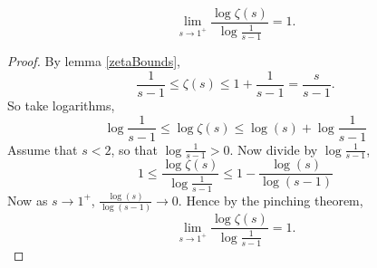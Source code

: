 \documentclass{unswmaths}
\begin{document}
    \begin{lemma}
    \label{zetaLimit}
        \begin{equation*}
            \lim_{s\rightarrow 1^+} \frac{\log\zeta(s)}{\log\frac{1}{s-1}} = 1.
        \end{equation*}
    \end{lemma}
    \begin{proof}
        By lemma \ref{zetaBounds}, 
        \begin{equation*}
            \frac{1}{s-1} \leq \zeta(s) \leq 1+\frac{1}{s-1} = \frac{s}{s-1}.
        \end{equation*}
        So take logarithms,
        \begin{equation*}
            \log\frac{1}{s-1} \leq \log\zeta(s) \leq \log(s) +\log\frac{1}{s-1}
        \end{equation*}
        Assume that $s < 2$, so that $\log\frac{1}{s-1} > 0$. Now divide by $\log\frac{1}{s-1}$,
        \begin{equation*}
            1 \leq \frac{\log\zeta(s)}{\log\frac{1}{s-1}} \leq 1 - \frac{\log(s)}{\log(s-1)}
        \end{equation*}
        Now as $s\rightarrow 1^+$, $\frac{\log(s)}{\log(s-1)}\rightarrow 0$.
        Hence by the pinching theorem,
        \begin{equation*}
            \lim_{s\rightarrow 1^+} \frac{\log\zeta(s)}{\log\frac{1}{s-1}} = 1.
        \end{equation*}
    \end{proof}
    
\end{document}
